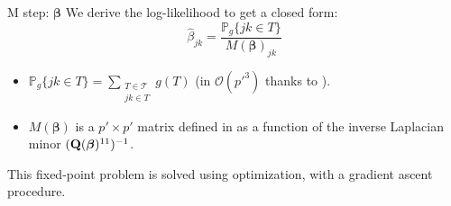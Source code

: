 \documentclass[11pt]{beamer}
\newcommand\Qb{{\bf Q}}
\newcommand{\betabf}{{\boldsymbol{\beta}}}
\begin{document}
  \begin{frame}{M step: $\betabf$}
We derive the log-likelihood to get a closed form:
  $$\widehat{\beta}_{jk} = \frac{\mathds{P}_g\{jk\in T\}}{M(\betabf)_{jk}}$$
  \begin{itemize}
  \item $\displaystyle \mathds{P}_g\{jk\in T\}=\sum_{\substack{T\in\mathcal{T}\\ jk\in T}} g(T)$ (in $\mathcal{O}(p'^3)$ thanks to \citet{kirshner}).
  \item $M(\betabf)$ is a $p'\times p'$ matrix defined in \citet{MeilaJaak} as a function of the inverse Laplacian minor $(\Qb(\betabf)^{11})^{-1}$.
  \end{itemize}
\bigskip

This fixed-point problem is solved using optimization, with a gradient ascent procedure.
  \end{frame}
\end{document}

